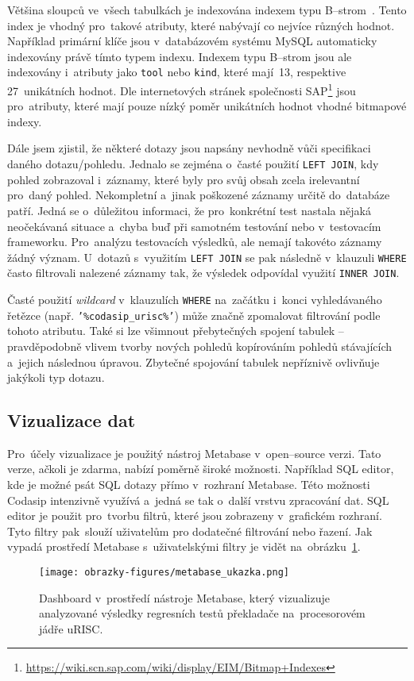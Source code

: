 Většina sloupců ve~všech tabulkách je indexována indexem typu B--strom~\cite{DatabaseInternals}. Tento index je
vhodný pro~takové atributy, které nabývají co nejvíce různých hodnot. Například primární klíče jsou v~databázovém systému MySQL automaticky indexovány právě tímto typem indexu. Indexem typu B--strom jsou ale indexovány i~atributy jako \texttt{tool} nebo \texttt{kind}, které mají~13, respektive 27~unikátních hodnot. Dle internetových stránek společnosti SAP\footnote{\href{https://wiki.scn.sap.com/wiki/display/EIM/Bitmap+Indexes}{https://wiki.scn.sap.com/wiki/display/EIM/Bitmap+Indexes}} jsou pro~atributy, které mají pouze nízký poměr unikátních hodnot vhodné bitmapové indexy.

Dále jsem zjistil, že některé dotazy jsou napsány nevhodně vůči specifikaci daného dotazu/pohledu. Jednalo se zejména
o~časté použití \texttt{LEFT JOIN}, kdy pohled zobrazoval i~záznamy, které byly pro svůj obsah zcela irelevantní
pro~daný pohled. Nekompletní a~jinak poškozené záznamy určitě do~databáze patří. Jedná se o~důležitou informaci, že
pro~konkrétní test nastala nějaká neočekávaná situace a~chyba buď při samotném testování nebo v~testovacím
frameworku. Pro~analýzu testovacích výsledků, ale nemají takovéto záznamy žádný význam. U~dotazů s~využitím
\texttt{LEFT JOIN} se pak následně v~klauzuli \texttt{WHERE} často filtrovali nalezené záznamy tak, že výsledek
odpovídal využití \texttt{INNER JOIN}.

Časté použití \textit{wildcard} v~klauzulích \texttt{WHERE} na~začátku i~konci vyhledávaného řetězce (např. \texttt{'\%codasip\_urisc\%'}) může značně zpomalovat filtrování podle tohoto atributu. Také si lze všimnout přebytečných spojení tabulek -- pravděpodobně vlivem tvorby nových pohledů kopírováním pohledů stávajících a~jejich následnou úpravou. Zbytečné spojování tabulek nepříznivě ovlivňuje jakýkoli typ dotazu.


\subsection{Vizualizace dat}
\label{subsection:vizualizace_dat}
Pro~účely vizualizace je použitý nástroj Metabase v~open--source verzi. Tato verze, ačkoli je zdarma, nabízí poměrně široké možnosti. Například SQL editor, kde je možné psát SQL dotazy přímo v~rozhraní Metabase. Této možnosti Codasip intenzivně využívá a~jedná se tak o~další vrstvu zpracování dat. SQL editor je použit pro~tvorbu filtrů, které jsou zobrazeny v~grafickém rozhraní. Tyto filtry pak~slouží uživatelům pro dodatečné filtrování nebo řazení. Jak vypadá prostředí Metabase s~uživatelskými filtry je vidět na~obrázku~\ref{img:metabase_ukazka}.
\begin{figure}[ht!]
	\centering
	\texttt{[image: obrazky-figures/metabase\_ukazka.png]}
	\caption{Dashboard v~prostředí nástroje Metabase{,} který vizualizuje analyzované výsledky regresních testů překladače na~procesorovém jádře uRISC.}
	\label{img:metabase_ukazka}
\end{figure}

